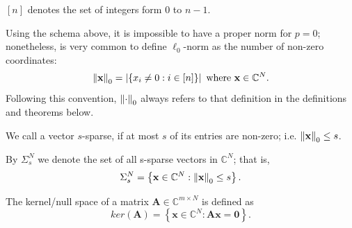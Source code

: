 \begin{tight_equations}
\begin{notation}
$[n]$ denotes the set of integers form $0$ to $n-1$.
\end{notation}

\begin{remark}
Using the schema above, it is impossible to have a proper norm for $p = 0$; nonetheless, is very common to define $\ell_0$-norm as the number of non-zero coordinates:
\[\left\lVert\mathbf{x}\right\rVert_0 = \left| \left\{x_i \ne 0 : i \in [n]\right\}\right| \text{ where } \mathbf{x} \in \mathbb{C}^N.\]
Following this convention, $\left\lVert\cdot\right\rVert_0$ always refers to that definition in the definitions and theorems below.
\end{remark}

\begin{definition}[sparsity]
We call a vector $s$-sparse, if at most $s$ of its entries are non-zero; i.e. $\left\lVert\mathbf{x}\right\rVert_0 \le s$.
\end{definition}

\begin{notation}
By $\Sigma_s^N$ we denote the set of all s-sparse vectors in $\mathbb{C}^N$; that is,
\[\Sigma_s^N = \left\{\mathbf{x} \in \mathbb{C}^N : \left\lVert\mathbf{x}\right\rVert_0 \le s \right\}.\]
\end{notation}



\begin{definition}
The kernel/null space of a matrix $\mathbf{A} \in \mathbb{C}^{m \times N}$ is defined as
\[ker(\mathbf{A}) = \left\{\mathbf{x} \in \mathbb{C}^N : \mathbf{Ax} = \mathbf{0}\right\}.\]
\end{definition}


\end{tight_equations}
